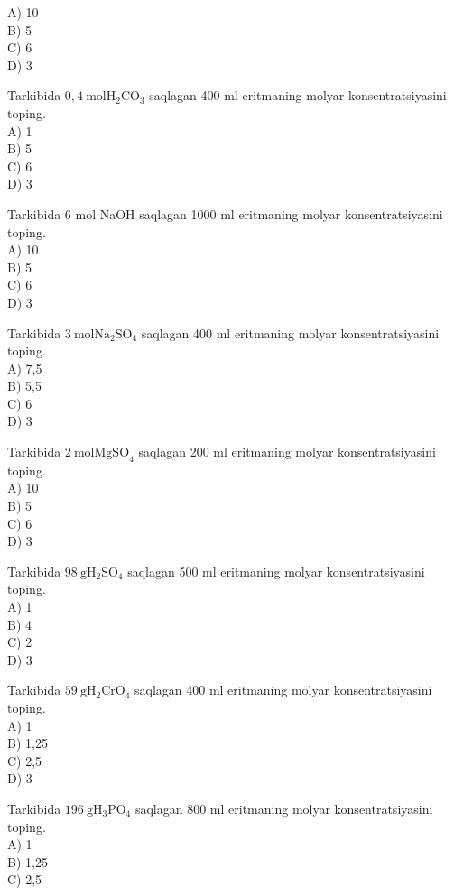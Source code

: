 A) 10\\
B) 5\\
C) 6\\
D) 3
  \item Tarkibida $0,4 \mathrm{~mol} \mathrm{H}_{2} \mathrm{CO}_{3}$ saqlagan 400 ml eritmaning molyar konsentratsiyasini toping.\\
A) 1\\
B) 5\\
C) 6\\
D) 3
  \item Tarkibida 6 mol NaOH saqlagan 1000 ml eritmaning molyar konsentratsiyasini toping.\\
A) 10\\
B) 5\\
C) 6\\
D) 3
  \item Tarkibida $3 \mathrm{~mol} \mathrm{Na}_{2} \mathrm{SO}_{4}$ saqlagan 400 ml eritmaning molyar konsentratsiyasini toping.\\
A) 7,5\\
B) 5,5\\
C) 6\\
D) 3
  \item Tarkibida $2 \mathrm{~mol} \mathrm{MgSO}_{4}$ saqlagan 200 ml eritmaning molyar konsentratsiyasini toping.\\
A) 10\\
B) 5\\
C) 6\\
D) 3
  \item Tarkibida $98 \mathrm{~g} \mathrm{H}_{2} \mathrm{SO}_{4}$ saqlagan 500 ml eritmaning molyar konsentratsiyasini toping.\\
A) 1\\
B) 4\\
C) 2\\
D) 3\\
  \item Tarkibida $59 \mathrm{~g} \mathrm{H}_{2} \mathrm{CrO}_{4}$ saqlagan 400 ml eritmaning molyar konsentratsiyasini toping.\\
A) 1\\
B) 1,25\\
C) 2,5\\
D) 3
  \item Tarkibida $196 \mathrm{~g} \mathrm{H}_{3} \mathrm{PO}_{4}$ saqlagan 800 ml eritmaning molyar konsentratsiyasini toping.\\
A) 1\\
B) 1,25\\
C) 2,5\\
